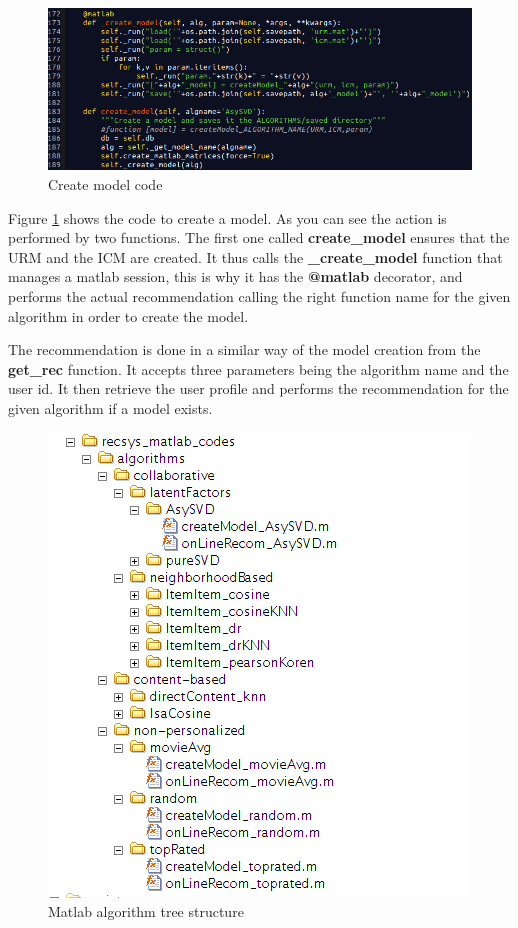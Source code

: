\begin{figure}
  \centering
  \includegraphics[width=\textwidth]{figures/create_model.png}
  \caption{Create model code}
  \label{fig:create_model}
\end{figure}

Figure \ref{fig:create_model} shows the code to create a model. As you can see the action is performed by two functions. The first one called \textbf{create\_model} ensures that the \ac{URM} and the \ac{ICM} are created. It thus calls the \textbf{\_create\_model} function that manages a matlab session, this is why it has the \textbf{@matlab} decorator, and performs the actual recommendation calling the right function name for the given algorithm in order to create the model.

The recommendation is done in a similar way of the model creation from the \textbf{get\_rec} function. It accepts three parameters being the algorithm name and the user id. It then retrieve the user profile and performs the recommendation for the given algorithm if a model exists.

\begin{figure}
  \centering
  \includegraphics[width=\textwidth]{figures/matlab_algorithms_tree.png}
  \caption{Matlab algorithm tree structure}
  \label{fig:matlab_tree_structure}
\end{figure}

